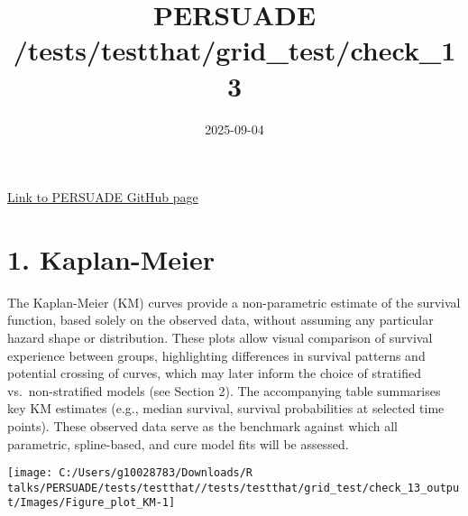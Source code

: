 \documentclass[
]{article}
\title{PERSUADE /tests/testthat/grid\_test/check\_13}
\author{}
\date{\vspace{-2.5em}2025-09-04}
\begin{document}
\maketitle

{
\hypersetup{linkcolor=}
\setcounter{tocdepth}{2}
\tableofcontents
}
\hfill\break

\href{https://github.com/Bram-R/PERSUADE}{Link to PERSUADE GitHub page}

\clearpage

\section{1. Kaplan-Meier}\label{kaplan-meier}

The Kaplan-Meier (KM) curves provide a non-parametric estimate of the
survival function, based solely on the observed data, without assuming
any particular hazard shape or distribution. These plots allow visual
comparison of survival experience between groups, highlighting
differences in survival patterns and potential crossing of curves, which
may later inform the choice of stratified vs.~non-stratified models (see
Section 2). The accompanying table summarises key KM estimates (e.g.,
median survival, survival probabilities at selected time points). These
observed data serve as the benchmark against which all parametric,
spline-based, and cure model fits will be assessed.

\clearpage

\begin{flushleft}\texttt{[image: C:/Users/g10028783/Downloads/R talks/PERSUADE/tests/testthat//tests/testthat/grid\_test/check\_13\_output/Images/Figure\_plot\_KM-1]} \end{flushleft}

\begin{table}[H]
\centering
\caption{\label{tab:Table_1}Observed survival data}
\centering
{}
\end{table}
\end{document}
